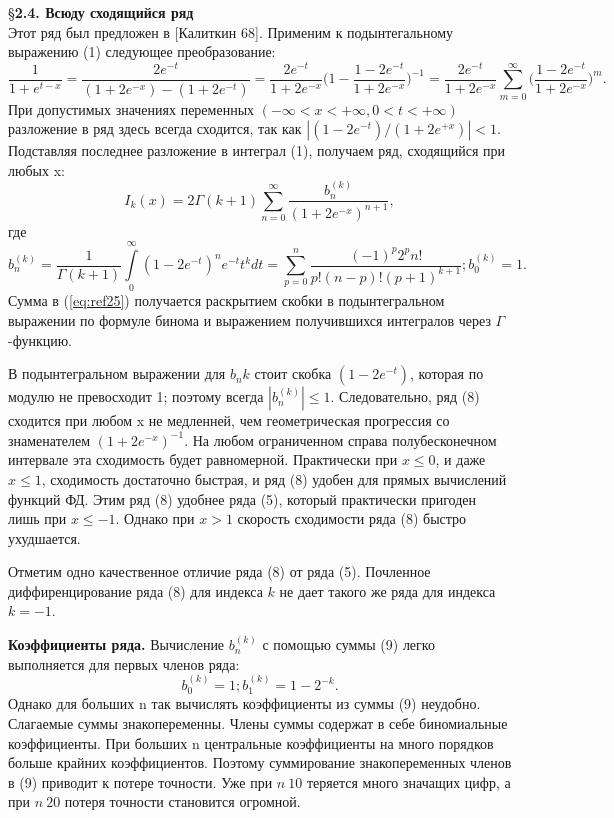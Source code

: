 \S \textbf{2.4. Всюду сходящийся ряд}
\\

Этот ряд был предложен в [Калиткин 68]. Применим к подынтегальному выражению
(1) следующее преобразование:
\begin{equation}
\frac{1}{1+e^{t-x}}=\frac{2e^{-t}}{(1+2e^{-x})-(1+2e^{-t})}=\frac{2e^{-t}}{1+2e^{-x}}\Bigg(1-\frac{1-2e^{-t}}{1+2e^{-x}}\Bigg)^{-1}=\frac{2e^{-t}}{1+2e^{-x}} \sum_{m=0}^{\infty} \Bigg(\frac{1-2e^{-t}}{1+2e^{-x}}\Bigg)^{m}.
\end{equation}
При допустимых значениях переменных $(-\infty < x < +\infty,0 < t < +\infty)$ разложение в
ряд здесь всегда сходится, так как $|(1-2e^{-t})/(1+2e^{+x})| < 1$. Подставляя
последнее разложение в интеграл (1), получаем ряд, сходящийся при любых x:
\begin{equation}
I_k(x)=2\Gamma(k+1)\sum_{n=0}^{\infty} \frac{b_n^{(k)}}{(1+2e^{-x})^{n+1}},
\label{eq:ref24}
\end{equation}
где
\begin{equation}
b_n^{(k)}=\frac{1}{\Gamma(k+1)}\int\limits_0^{\infty} (1-2e^{-t})^ne^{-t}t^kdt=\sum\limits_{p=0}^n \frac{(-1)^p 2^p n!}{p!(n-p)!(p+1)^{k+1}};b_0^{(k)}=1.
\label{eq:ref25}
\end{equation}
Сумма в (\ref{eq:ref25}) получается раскрытием скобки в подынтегральном выражении по
формуле бинома и выражением получившихся интегралов через $\Gamma$ -функцию.

В подынтегральном выражении для $b_nk$ стоит скобка $(1-2e^{-t})$, которая по
модулю не превосходит 1; поэтому всегда $|b_n^{(k)}| \leqslant 1$.
Следовательно, ряд (8) сходится при любом x не медленней, чем геометрическая прогрессия со
знаменателем $(1+2e^{-x})^{-1}$. На любом ограниченном справа полубесконечном
интервале эта сходимость будет равномерной. Практически при $x \leqslant 0$, и даже
$x \leqslant 1$, сходимость достаточно быстрая, и ряд (8) удобен для прямых вычислений
функций ФД. Этим ряд (8) удобнее ряда (5), который практически пригоден
лишь при $x \leqslant -1$. Однако при $x > 1$ скорость сходимости ряда (8) быстро
ухудшается.

Отметим одно качественное отличие ряда (8) от ряда (5). Почленное
диффиренцирование ряда (8) для индекса $k$ не дает такого же ряда для индекса
$k=-1$.

\textbf{Коэффициенты ряда.} Вычисление $b_n^{(k)}$ с помощью суммы (9) легко
выполняется для первых членов ряда:
\begin{equation}
b_0^{(k)}=1;b_1^{(k)}=1-2^{-k}.
\end{equation}
Однако для больших n так вычислять коэффициенты из суммы (9) неудобно.
Слагаемые суммы знакопеременны. Члены суммы содержат в себе
биномиальные коэффициенты. При больших n центральные коэффициенты на
много порядков больше крайних коэффициентов. Поэтому суммирование
знакопеременных членов в (9) приводит к потере точности. Уже при $n~10$
теряется много значащих цифр, а при $n~20$ потеря точности становится
огромной.

